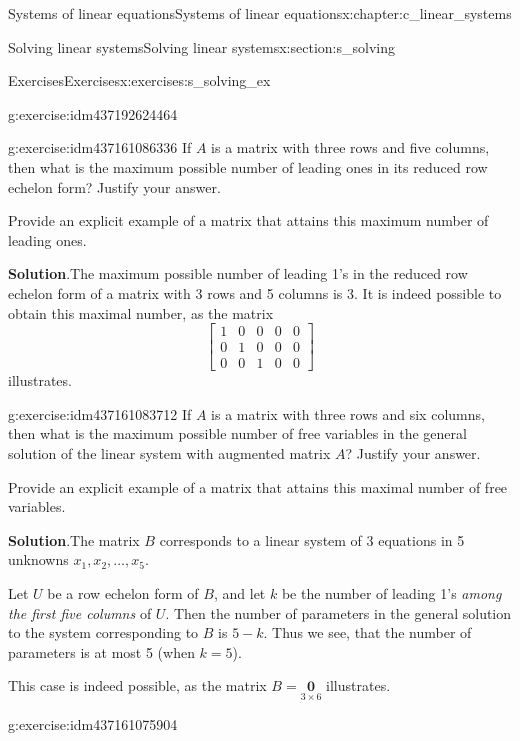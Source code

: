 \documentclass[oneside,10pt,]{book}
\newcommand{\blocktitlefont}{\relax}
\numberwithin{equation}{section}
\newcommand{\boldzero}{{\mathbf 0}}
\newcommand{\amp}{&}
\begin{document}
\begin{chapterptx}{Systems of linear equations}{}{Systems of linear equations}{}{}{x:chapter:c_linear_systems}
\begin{sectionptx}{Solving linear systems}{}{Solving linear systems}{}{}{x:section:s_solving}
\begin{exercises-subsection-numberless}{Exercises}{}{Exercises}{}{}{x:exercises:s_solving_ex}
\begin{divisionexercise}{11}{}{}{g:exercise:idm437192624464}
%
\end{divisionexercise}%
\begin{divisionexercise}{12}{}{}{g:exercise:idm437161086336}%
If \(A\) is a matrix with three rows and five columns, then what is the maximum possible number of leading ones in its reduced row echelon form? Justify your answer.%
\par
Provide an explicit example of a matrix that attains this maximum number of leading ones.%
\par\smallskip%
\noindent\textbf{\blocktitlefont Solution}.\hypertarget{g:solution:idm437161084816}{}\quad{}The maximum possible number of leading 1's in the reduced row echelon form of a matrix with 3 rows and 5 columns is 3. It is indeed possible to obtain this maximal number, as the matrix%
\begin{equation*}
\begin{bmatrix}1\amp 0\amp 0\amp 0\amp 0\\ 0\amp 1\amp 0\amp 0\amp 0\\ 0\amp 0\amp 1\amp 0\amp 0 \end{bmatrix}
\end{equation*}
illustrates.%
\end{divisionexercise}%
\begin{divisionexercise}{13}{}{}{g:exercise:idm437161083712}%
If \(A\) is a matrix with three rows and six columns, then what is the maximum possible number of free variables in the general solution of the linear system with augmented matrix \(A\)? Justify your answer.%
\par
Provide an explicit example of a matrix that attains this maximal number of free variables.%
\par\smallskip%
\noindent\textbf{\blocktitlefont Solution}.\hypertarget{g:solution:idm437161081792}{}\quad{}The matrix \(B\) corresponds to a linear system of 3 equations in 5 unknowns \(x_1, x_2, \dots, x_5\).%
\par
Let \(U\) be a row echelon form of \(B\), and let \(k\) be the number of leading 1's \emph{among the first five columns} of \(U\). Then the number of parameters in the general solution to the system corresponding to \(B\) is \(5-k\). Thus we see, that the number of parameters is at most 5 (when \(k=5\)).%
\par
This case is indeed possible, as the matrix \(B=\underset{3\times 6}{\boldzero}\) illustrates.%
\end{divisionexercise}%
\begin{divisionexercise}{14}{}{}{g:exercise:idm437161075904}%

\end{divisionexercise}
\end{exercises-subsection-numberless}
\end{sectionptx}
\end{chapterptx}
\end{document}
